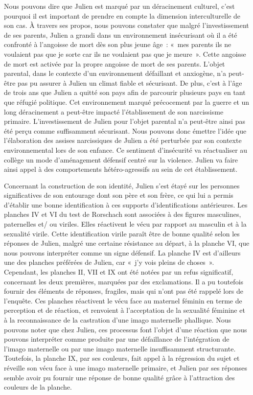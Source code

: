 \documentclass[12pt, a4paper]{book}
\begin{document}
\begin{spacing}{1.5}
Nous pouvons dire que Julien est marqué par un déracinement culturel, c'est pourquoi il est important de prendre en compte la dimension interculturelle de son cas.  À travers ses propos, nous pouvons constater que malgré l'investissement de ses parents, Julien a grandi dans un environnement insécurisant où il a été confronté à l'angoisse de mort dès son plus jeune âge : « mes parents ils ne voulaient pas que je sorte car ils ne voulaient pas que je meure ». Cette angoisse de mort est activée par la propre angoisse de mort de ses parents. L'objet parental, dans le contexte d'un environnement défaillant et anxiogène, n'a peut-être pas pu assurer à Julien un climat fiable et sécurisant. De plus, c'est à l'âge de trois ans que Julien a quitté son pays afin de parcourir plusieurs pays en tant que réfugié politique. Cet environnement marqué précocement par la guerre et un long déracinement a peut-être impacté l'établissement de son narcissisme primaire. L'investissement de Julien pour l'objet parental  n'a peut-être ainsi pas été perçu comme suffisamment sécurisant. Nous pouvons donc émettre l'idée que l'élaboration des assises narcissiques de Julien a été perturbée par son contexte environnemental lors de son enfance. Ce sentiment d'insécurité va réactualiser au collège un mode d'aménagement défensif centré sur la violence. Julien va faire ainsi appel à des comportements hétéro-agressifs au sein de cet établissement.  

Concernant la construction de son identité, Julien s'est étayé sur les personnes significatives de son entourage dont son père et son frère, ce qui lui a permis d'établir une bonne identification à ces supports d'identifications antérieures. Les planches IV et VI du test de Rorschach sont associées à des figures masculines, paternelles et/ ou viriles. Elles réactivent le vécu par rapport au masculin et à la sexualité virile. Cette identification virile paraît être de bonne qualité selon les réponses de Julien, malgré une certaine résistance au départ, à la planche VI, que nous pouvons interpréter comme un signe défensif. La planche IV est d'ailleurs une des planches préférées de Julien, car « j'y vois pleins de choses ». Cependant, les planches II, VII et IX ont été notées par un refus significatif, concernant les deux premières, marquées par des exclamations. Il a pu toutefois fournir des éléments de réponses, fragiles, mais qui n'ont pas été rappelé lors de l'enquête. Ces planches réactivent le vécu face au maternel féminin en terme de perception et de réaction, et renvoient à l'acceptation de la sexualité féminine et à la reconnaissance de la castration d'une imago maternelle phallique. Nous pouvons noter que chez Julien, ces processus font l'objet d'une réaction que nous pouvons interpréter comme produite par une défaillance de l'intégration de l'imago maternelle ou par une imago maternelle insuffisamment structurante. Toutefois, la planche IX, par ses couleurs, fait appel à la régression du sujet et réveille son vécu face à une imago maternelle primaire, et Julien par ses réponses semble avoir pu fournir une réponse de bonne qualité grâce à l'attraction des couleurs de la planche.


\end{spacing}
\end{document}
